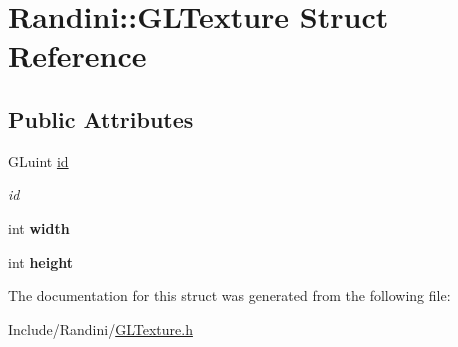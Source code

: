 \hypertarget{structRandini_1_1GLTexture}{
\section{Randini::GLTexture Struct Reference}
\label{structRandini_1_1GLTexture}
}
\subsection*{Public Attributes}
\begin{DoxyCompactItemize}
\item 
\hypertarget{structRandini_1_1GLTexture_a3117c23b15d40c3d74839389375c5555}{
GLuint \hyperlink{structRandini_1_1GLTexture_a3117c23b15d40c3d74839389375c5555}{id}}
\label{structRandini_1_1GLTexture_a3117c23b15d40c3d74839389375c5555}

\begin{DoxyCompactList}\small\item\em id \item\end{DoxyCompactList}\item 
\hypertarget{structRandini_1_1GLTexture_a6396e1a205d08bd964fafb1e36015424}{
int {\bfseries width}}
\label{structRandini_1_1GLTexture_a6396e1a205d08bd964fafb1e36015424}

\item 
\hypertarget{structRandini_1_1GLTexture_a201cce365bc9eec2b43a7b3b4522109c}{
int {\bfseries height}}
\label{structRandini_1_1GLTexture_a201cce365bc9eec2b43a7b3b4522109c}

\end{DoxyCompactItemize}


The documentation for this struct was generated from the following file:\begin{DoxyCompactItemize}
\item 
Include/Randini/\hyperlink{GLTexture_8h}{GLTexture.h}\end{DoxyCompactItemize}
